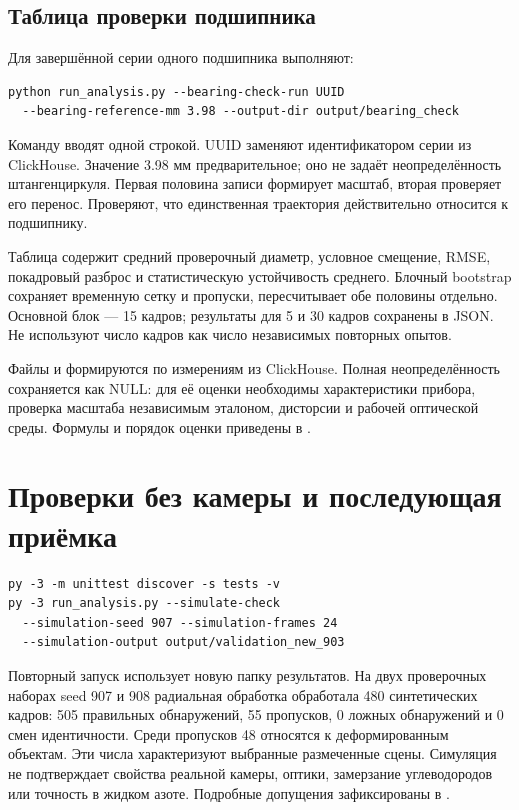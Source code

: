 \documentclass[12pt,a4paper]{article}
\begin{document}
\subsection{Таблица проверки подшипника}
Для завершённой серии одного подшипника выполняют:
\begin{verbatim}
python run_analysis.py --bearing-check-run UUID
  --bearing-reference-mm 3.98 --output-dir output/bearing_check
\end{verbatim}
Команду вводят одной строкой. UUID заменяют идентификатором серии из ClickHouse. Значение 3.98 мм предварительное; оно не задаёт неопределённость штангенциркуля. Первая половина записи формирует масштаб, вторая проверяет его перенос. Проверяют, что единственная траектория действительно относится к подшипнику.

Таблица содержит средний проверочный диаметр, условное смещение, RMSE, покадровый разброс и статистическую устойчивость среднего. Блочный bootstrap сохраняет временную сетку и пропуски, пересчитывает обе половины отдельно. Основной блок --- 15 кадров; результаты для 5 и 30 кадров сохранены в JSON. Не используют число кадров как число независимых повторных опытов.

Файлы  и  формируются по измерениям из ClickHouse. Полная неопределённость сохраняется как NULL: для её оценки необходимы характеристики прибора, проверка масштаба независимым эталоном, дисторсии и рабочей оптической среды. Формулы и порядок оценки приведены в .

\section{Проверки без камеры и последующая приёмка}
\begin{verbatim}
py -3 -m unittest discover -s tests -v
py -3 run_analysis.py --simulate-check
  --simulation-seed 907 --simulation-frames 24
  --simulation-output output/validation_new_903
\end{verbatim}
Повторный запуск использует новую папку результатов. На двух проверочных наборах seed 907 и 908 радиальная обработка обработала 480 синтетических кадров: 505 правильных обнаружений, 55 пропусков, 0 ложных обнаружений и 0 смен идентичности. Среди пропусков 48 относятся к деформированным объектам. Эти числа характеризуют выбранные размеченные сцены. Симуляция не подтверждает свойства реальной камеры, оптики, замерзание углеводородов или точность в жидком азоте. Подробные допущения зафиксированы в .
\end{document}
